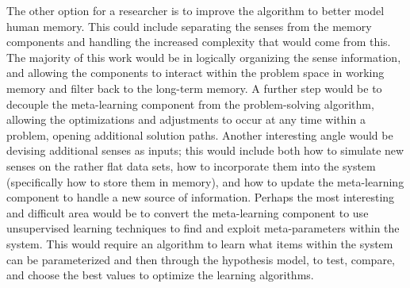 The other option for a researcher is to improve the algorithm to better model
human memory. This could include separating the senses from the memory
components and handling the increased complexity that would come from this. The
majority of this work would be in logically organizing the sense information,
and allowing the components to interact within the problem space in working
memory and filter back to the long-term memory. A further step would be to
decouple the meta-learning component from the problem-solving algorithm,
allowing the optimizations and adjustments to occur at any time within a
problem, opening additional solution paths.  Another interesting angle would be
devising additional senses as inputs; this would include both how to simulate
new senses on the rather flat data sets, how to incorporate them into the system
(specifically how to store them in memory), and how to update the meta-learning
component to handle a new source of information.  Perhaps the most interesting
and difficult area would be to convert the meta-learning component to use
unsupervised learning techniques to find and exploit meta-parameters within the
system.  This would require an algorithm to learn what items within the system
can be parameterized and then through the hypothesis model, to test, compare,
and choose the best values to optimize the learning algorithms.
